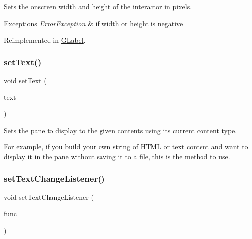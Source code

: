 Sets the onscreen width and height of the interactor in pixels. 


\begin{DoxyExceptions}{Exceptions}
{\em Error\+Exception} & if width or height is negative \\
\hline
\end{DoxyExceptions}


Reimplemented in \mbox{\hyperlink{classGLabel_a42d96e60c62d7770993327d7147d77b8}{G\+Label}}.

\mbox{\label{classGBrowserPane_ac1ae51949d41ee9054634be5967d91b8}} 
\subsubsection{\texorpdfstring{set\+Text()}{setText()}}
{\footnotesize\ttfamily void set\+Text (\begin{DoxyParamCaption}\item[{const std\+::string \&}]{text }\end{DoxyParamCaption})\hspace{0.3cm}{\ttfamily [virtual]}}



Sets the pane to display to the given contents using its current content type. 

For example, if you build your own string of H\+T\+ML or text content and want to display it in the pane without saving it to a file, this is the method to use. \mbox{\label{classGBrowserPane_ae41284f9c540110180ac0ad6beca5cb0}} 
\subsubsection{\texorpdfstring{set\+Text\+Change\+Listener()}{setTextChangeListener()}\hspace{0.1cm}{\footnotesize\ttfamily [1/2]}}
{\footnotesize\ttfamily void set\+Text\+Change\+Listener (\begin{DoxyParamCaption}\item[{G\+Event\+Listener}]{func }\end{DoxyParamCaption})\hspace{0.3cm}{\ttfamily [virtual]}}



